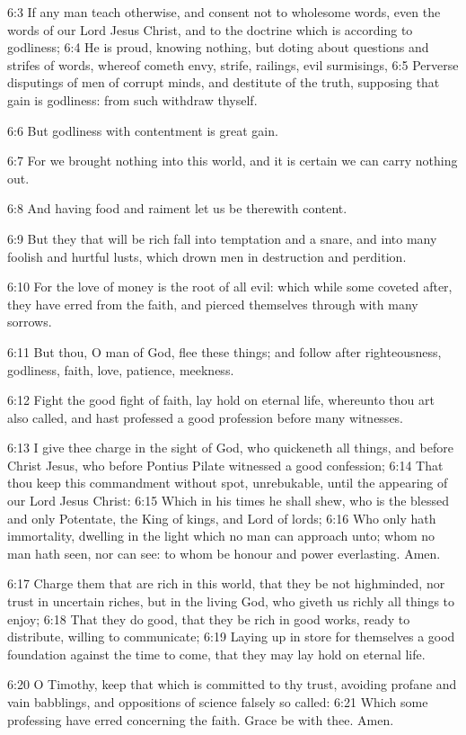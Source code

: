 6:3 If any man teach otherwise, and consent not to wholesome words,
even the words of our Lord Jesus Christ, and to the doctrine which is
according to godliness; 6:4 He is proud, knowing nothing, but doting
about questions and strifes of words, whereof cometh envy, strife,
railings, evil surmisings, 6:5 Perverse disputings of men of corrupt
minds, and destitute of the truth, supposing that gain is godliness:
from such withdraw thyself.

6:6 But godliness with contentment is great gain.

6:7 For we brought nothing into this world, and it is certain we can
carry nothing out.

6:8 And having food and raiment let us be therewith content.

6:9 But they that will be rich fall into temptation and a snare, and
into many foolish and hurtful lusts, which drown men in destruction
and perdition.

6:10 For the love of money is the root of all evil: which while some
coveted after, they have erred from the faith, and pierced themselves
through with many sorrows.

6:11 But thou, O man of God, flee these things; and follow after
righteousness, godliness, faith, love, patience, meekness.

6:12 Fight the good fight of faith, lay hold on eternal life,
whereunto thou art also called, and hast professed a good profession
before many witnesses.

6:13 I give thee charge in the sight of God, who quickeneth all
things, and before Christ Jesus, who before Pontius Pilate witnessed a
good confession; 6:14 That thou keep this commandment without spot,
unrebukable, until the appearing of our Lord Jesus Christ: 6:15 Which
in his times he shall shew, who is the blessed and only Potentate, the
King of kings, and Lord of lords; 6:16 Who only hath immortality,
dwelling in the light which no man can approach unto; whom no man hath
seen, nor can see: to whom be honour and power everlasting. Amen.

6:17 Charge them that are rich in this world, that they be not
highminded, nor trust in uncertain riches, but in the living God, who
giveth us richly all things to enjoy; 6:18 That they do good, that
they be rich in good works, ready to distribute, willing to
communicate; 6:19 Laying up in store for themselves a good foundation
against the time to come, that they may lay hold on eternal life.

6:20 O Timothy, keep that which is committed to thy trust, avoiding
profane and vain babblings, and oppositions of science falsely so
called: 6:21 Which some professing have erred concerning the faith.
Grace be with thee. Amen.

